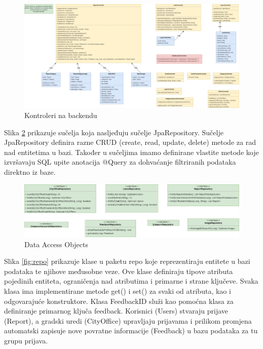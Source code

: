 			\begin{figure}[H]
				\includegraphics[width=\textwidth]{slike/dijagramRazreda/controller.jpg} %
				\caption{Kontroleri na backendu}
				\label{fig:kontroler} %
			\end{figure}
			
			\eject
			
			Slika \ref{fig:dao} prikazuje sučelja koja nasljeđuju sučelje JpaRepository. Sučelje JpaRepository definira razne CRUD (create, read, update, delete) metode za rad nad entitetima u bazi. Također u sučeljima imamo definirane vlastite metode koje izvršavaju SQL upite anotacija @Query za dohvaćanje filtriranih podataka direktno iz baze.
			
			\begin{figure}[H]
				\includegraphics[width=\textwidth]{slike/dijagramRazreda/DAOs.jpg} %
				\caption{Data Access Objects}
				\label{fig:dao} %
			\end{figure}
			
			\eject
			
			Slika \ref{fig:repo} prikazuje klase u paketu repo koje reprezentiraju entitete u bazi podataka te njihove međusobne veze. Ove klase definiraju tipove atributa pojedinih entiteta, ograničenja nad atributima i primarne i strane ključeve. Svaka klasa ima implementirane metode get() i set() za svaki od atributa, kao i odgovarajuće konstruktore. Klasa FeedbackID služi kao pomoćna klasa za definiranje primarnog ključa feedback. Korisnici (Users) stvaraju prijave (Report), a gradski uredi (CityOffice) upravljaju prijavama i prilikom promjena automatski zapisuje nove povratne informacije (Feedback) u bazu podataka za tu grupu prijava.
			
